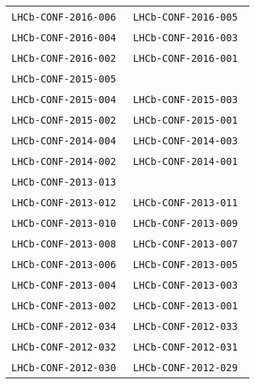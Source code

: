 \begin{center}
\begin{longtable}{ll}
\texttt{LHCb-CONF-2016-006}~\cite{LHCb-CONF-2016-006} &
\texttt{LHCb-CONF-2016-005}~\cite{LHCb-CONF-2016-005} \\
\texttt{LHCb-CONF-2016-004}~\cite{LHCb-CONF-2016-004} &
\texttt{LHCb-CONF-2016-003}~\cite{LHCb-CONF-2016-003} \\
\texttt{LHCb-CONF-2016-002}~\cite{LHCb-CONF-2016-002} &
\texttt{LHCb-CONF-2016-001}~\cite{LHCb-CONF-2016-001} \\
\hline
\texttt{LHCb-CONF-2015-005}~\cite{LHCb-CONF-2015-005} \\
\texttt{LHCb-CONF-2015-004}~\cite{LHCb-CONF-2015-004} &
\texttt{LHCb-CONF-2015-003}~\cite{LHCb-CONF-2015-003} \\
\texttt{LHCb-CONF-2015-002}~\cite{LHCb-CONF-2015-002} &
\texttt{LHCb-CONF-2015-001}~\cite{LHCb-CONF-2015-001} \\
\hline
\texttt{LHCb-CONF-2014-004}~\cite{LHCb-CONF-2014-004} &
\texttt{LHCb-CONF-2014-003}~\cite{LHCb-CONF-2014-003} \\
\texttt{LHCb-CONF-2014-002}~\cite{LHCb-CONF-2014-002} &
\texttt{LHCb-CONF-2014-001}~\cite{LHCb-CONF-2014-001} \\
\hline
\texttt{LHCb-CONF-2013-013}~\cite{LHCb-CONF-2013-013} \\
\texttt{LHCb-CONF-2013-012}~\cite{LHCb-CONF-2013-012} &
\texttt{LHCb-CONF-2013-011}~\cite{LHCb-CONF-2013-011} \\
\texttt{LHCb-CONF-2013-010}~\cite{LHCb-CONF-2013-010} &
\texttt{LHCb-CONF-2013-009}~\cite{LHCb-CONF-2013-009} \\
\texttt{LHCb-CONF-2013-008}~\cite{LHCb-CONF-2013-008} &
\texttt{LHCb-CONF-2013-007}~\cite{LHCb-CONF-2013-007} \\
\texttt{LHCb-CONF-2013-006}~\cite{LHCb-CONF-2013-006} &
\texttt{LHCb-CONF-2013-005}~\cite{LHCb-CONF-2013-005} \\
\texttt{LHCb-CONF-2013-004}~\cite{LHCb-CONF-2013-004} &
\texttt{LHCb-CONF-2013-003}~\cite{LHCb-CONF-2013-003} \\
\texttt{LHCb-CONF-2013-002}~\cite{LHCb-CONF-2013-002} &
\texttt{LHCb-CONF-2013-001}~\cite{LHCb-CONF-2013-001} \\
\hline
\texttt{LHCb-CONF-2012-034}~\cite{LHCb-CONF-2012-034} & 
\texttt{LHCb-CONF-2012-033}~\cite{LHCb-CONF-2012-033} \\
\texttt{LHCb-CONF-2012-032}~\cite{LHCb-CONF-2012-032} & 
\texttt{LHCb-CONF-2012-031}~\cite{LHCb-CONF-2012-031} \\
\texttt{LHCb-CONF-2012-030}~\cite{LHCb-CONF-2012-030} & 
\texttt{LHCb-CONF-2012-029}~\cite{LHCb-CONF-2012-029} \\

\end{longtable}
\end{center}
